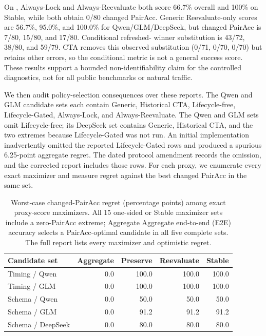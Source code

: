 \documentclass[10pt]{article}
\begin{document}
On \NewSchemaReplication{}, Always-Lock and Always-Reevaluate both score 66.7\% overall and 100\% on Stable, while
both obtain 0/80 changed PairAcc. Generic Reevaluate-only scores are 56.7\%, 95.0\%, and 100.0\%
for Qwen/GLM/DeepSeek, but changed PairAcc is 7/80, 15/80, and 17/80. Conditional refreshed-
winner substitution is 43/72, 38/80, and 59/79. CTA removes this observed substitution (0/71, 0/70, 0/70)
but retains other errors, so the conditional metric is not a general success score. These results
support a bounded non-identifiability claim for the controlled diagnostics, not for all public
benchmarks or natural traffic.

We then audit policy-selection consequences over these reports. The \PrimaryDiagnostic{} Qwen and GLM candidate
sets each contain Generic, Historical CTA, Lifecycle-free, Lifecycle-Gated, Always-Lock, and
Always-Reevaluate. The \NewSchemaReplication{} Qwen and GLM sets omit Lifecycle-free; its DeepSeek set contains
Generic, Historical CTA, and the two extremes because Lifecycle-Gated was not run. An initial
implementation inadvertently omitted the reported Lifecycle-Gated rows and produced a spurious
6.25-point aggregate regret. The dated protocol amendment records the omission, and the corrected
report includes those rows. For each proxy, we enumerate every exact maximizer and measure regret
against the best changed PairAcc in the same set.

\begin{table}[h]
\centering
\small
\begin{tabular}{lrrrr}
\toprule
Candidate set & Aggregate & Preserve & Reevaluate & Stable \\
\midrule
Timing / Qwen & 0.0 & 100.0 & 100.0 & 100.0 \\
Timing / GLM & 0.0 & 100.0 & 100.0 & 100.0 \\
Schema / Qwen & 0.0 & 50.0 & 50.0 & 50.0 \\
Schema / GLM & 0.0 & 91.2 & 91.2 & 91.2 \\
Schema / DeepSeek & 0.0 & 80.0 & 80.0 & 80.0 \\
\bottomrule
\end{tabular}
\caption{Worst-case changed-PairAcc regret (percentage points) among exact proxy-score
maximizers. All 15 one-sided or Stable maximizer sets include a zero-PairAcc extreme; Aggregate
Aggregate end-to-end (E2E) accuracy selects a PairAcc-optimal candidate in all five complete sets. The full report lists every
maximizer and optimistic regret.}
\label{tab:supp-selection-regret}
\end{table}
\end{document}
